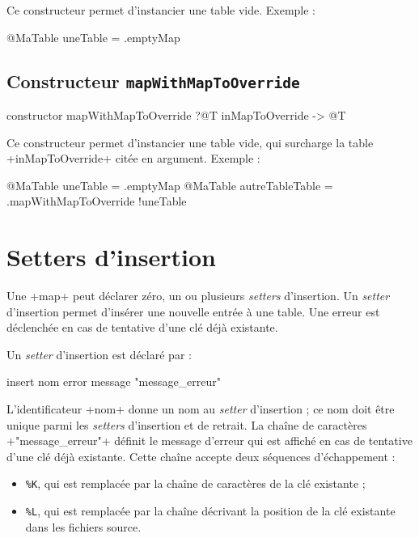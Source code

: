 Ce constructeur permet d'instancier une table vide. Exemple :
\begin{galgascode}
@MaTable uneTable = .emptyMap
\end{galgascode}

 

\subsection{Constructeur \texttt{mapWithMapToOverride}}

\begin{galgascode}
constructor mapWithMapToOverride ?@T inMapToOverride -> @T
\end{galgascode}

Ce constructeur permet d'instancier une table vide, qui surcharge la table \ggs+inMapToOverride+ citée en argument. Exemple :
\begin{galgascode}
@MaTable uneTable = .emptyMap
@MaTable autreTableTable = .mapWithMapToOverride {!uneTable}
\end{galgascode}






\section{Setters d'insertion}

Une \ggs+map+ peut déclarer zéro, un ou plusieurs \emph{setters} d'insertion. Un \emph{setter} d'insertion permet d'insérer une nouvelle entrée à une table. Une erreur est déclenchée en cas de tentative d'une clé déjà existante.


Un \emph{setter} d'insertion est déclaré par :

\begin{galgascode}
insert nom error message "message_erreur"
\end{galgascode}

L'identificateur \ggs+nom+ donne un nom au \emph{setter} d'insertion ; ce nom doit être unique parmi les \emph{setters} d'insertion et de retrait. La chaîne de caractères \ggs+"message_erreur"+ définit le message d'erreur qui est affiché en cas de tentative d'une clé déjà existante. Cette chaîne accepte deux séquences d'échappement :
\begin{itemize}
  \item \texttt{\%K}, qui est remplacée par la chaîne de caractères de la clé existante ;
  \item \texttt{\%L}, qui est remplacée par la chaîne décrivant la position de la clé existante dans les fichiers source.
\end{itemize}


